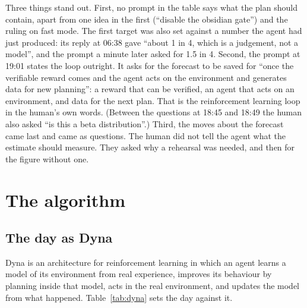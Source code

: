 \documentclass[11pt,a4paper]{article}
\begin{document}
Three things stand out. First, no prompt in the table says what the plan should contain, apart from one idea in the first (``disable the obsidian gate'') and the ruling on fast mode. The first target was also set against a number the agent had just produced: its reply at 06:38 gave ``about 1 in 4, which is a judgement, not a model'', and the prompt a minute later asked for 1.5 in 4. Second, the prompt at 19:01 states the loop outright. It asks for the forecast to be saved for ``once the verifiable reward comes and the agent acts on the environment and generates data for new planning'': a reward that can be verified, an agent that acts on an environment, and data for the next plan. That is the reinforcement learning loop in the human's own words. (Between the questions at 18:45 and 18:49 the human also asked ``is this a beta distribution''.) Third, the moves about the forecast came last and came as questions. The human did not tell the agent what the estimate should measure. They asked why a rehearsal was needed, and then for the figure without one.

\section{The algorithm}
\label{sec:algorithm}

\subsection{The day as Dyna}

Dyna \citep{sutton1991dyna,sutton2018} is an architecture for reinforcement learning in which an agent learns a model of its environment from real experience, improves its behaviour by planning inside that model, acts in the real environment, and updates the model from what happened. Table~\ref{tab:dyna} sets the day against it.
\end{document}
